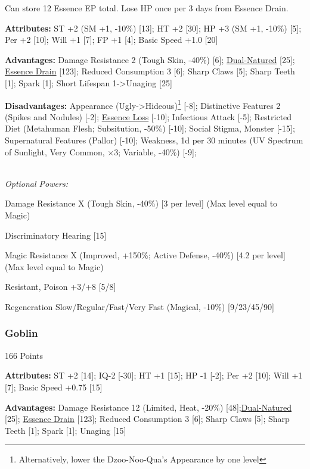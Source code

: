 \begin{multicols*}{3}
	Can store 12 Essence EP total.
	Lose HP once per 3 days from Essence Drain.
	
	\textbf{Attributes:}
	ST +2 (SM +1, -10\%) [13]; HT +2 [30]; HP +3 (SM +1, -10\%) [5]; Per +2 [10]; Will +1 [7]; FP +1 [4]; Basic Speed +1.0 [20]
	
	\textbf{Advantages:}
	Damage Resistance 2 (Tough Skin, -40\%) [6]; \hyperref[dual_natured]{Dual-Natured} [25];  \hyperref[essence_drain]{Essence Drain} [123]; Reduced Consumption 3 [6]; Sharp Claws [5]; Sharp Teeth [1]; Spark [1]; Short Lifespan 1->Unaging [25]
	
	\textbf{Disadvantages:}	
	Appearance (Ugly->Hideous)\footnote{Alternatively, lower the Dzoo-Noo-Qua's Appearance by one level} [-8]; Distinctive Features 2 (Spikes and Nodules) [-2]; \hyperref[essence_loss]{Essence Loss} [-10]; Infectious Attack [-5]; Restricted Diet (Metahuman Flesh; Subsitution, -50\%) [-10]; Social Stigma, Monster [-15]; Supernatural Features (Pallor) [-10]; Weakness, 1d per 30 minutes (UV Spectrum of Sunlight, Very Common, $\times$3; Variable, -40\%) [-9];
	
	\textit{\\Optional Powers:}
	
	Damage Resistance X (Tough Skin, -40\%) [3 per level] (Max level equal to Magic)
	
	Discriminatory Hearing [15]
		
	Magic Resistance X (Improved, +150\%; Active Defense, -40\%) [4.2 per level] (Max level equal to Magic)
	
	Resistant, Poison +3/+8 [5/8]
	
	Regeneration Slow/Regular/Fast/Very Fast (Magical, -10\%) [9/23/45/90]	

	\subsubsection{Goblin}\label{goblin}
	\begin{flushright}
		166 Points
	\end{flushright}

	\textbf{Attributes:}
	ST +2 [14]; IQ-2 [-30]; HT +1 [15]; HP -1 [-2]; Per +2 [10]; Will +1 [7]; Basic Speed +0.75 [15]
	
	\textbf{Advantages:}
	Damage Resistance 12 (Limited, Heat, -20\%) [48];\hyperref[dual_natured]{Dual-Natured} [25];  \hyperref[essence_drain]{Essence Drain} [123]; Reduced Consumption 3 [6]; Sharp Claws [5]; Sharp Teeth [1]; Spark [1]; Unaging [15]
	

\end{multicols*}
